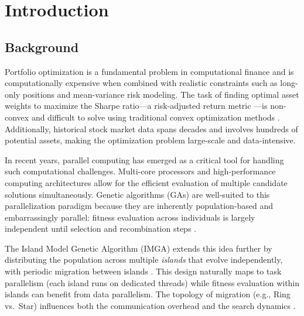 \documentclass[12pt,a4paper]{article}
\begin{document}


\renewcommand*\contentsname{Table of Contents}
\tableofcontents
\newpage
\newpage
\listoffigures
\newpage
\newpage
\listoftables
\newpage
{}

\section{Introduction}

\subsection{Background}

Portfolio optimization is a fundamental problem in computational finance and is computationally expensive when combined with realistic constraints such as long-only positions and mean-variance risk modeling. The task of finding optimal asset weights to maximize the Sharpe ratio---a risk-adjusted return metric \cite{sharpe1966mutual}---is non-convex and difficult to solve using traditional convex optimization methods \cite{markowitz1952portfolio}. Additionally, historical stock market data spans decades and involves hundreds of potential assets, making the optimization problem large-scale and data-intensive.

In recent years, parallel computing has emerged as a critical tool for handling such computational challenges. Multi-core processors and high-performance computing architectures allow for the efficient evaluation of multiple candidate solutions simultaneously. Genetic algorithms (GAs) are well-suited to this parallelization paradigm because they are inherently population-based and embarrassingly parallel: fitness evaluation across individuals is largely independent until selection and recombination steps \cite{goldberg1989genetic}.

The Island Model Genetic Algorithm (IMGA) extends this idea further by distributing the population across multiple \textit{islands} that evolve independently, with periodic migration between islands \cite{tanese1989distributed}. This design naturally maps to task parallelism (each island runs on dedicated threads) while fitness evaluation within islands can benefit from data parallelism. The topology of migration (e.g., Ring vs.~Star) influences both the communication overhead and the search dynamics \cite{branke2003parallel}.
\end{document}
